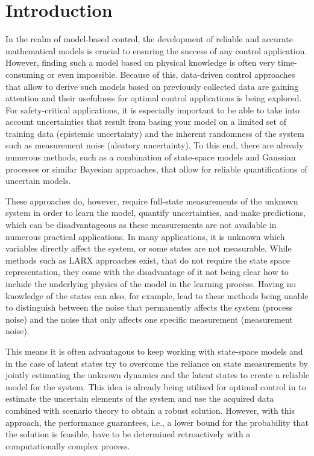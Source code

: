 \chapter{Introduction}
\label{sec:introduction}

In the realm of model-based control, the development of reliable and accurate mathematical models is crucial to ensuring the success of any control application. However, finding such a model based on physical knowledge is often very time-consuming or even impossible. Because of this, data-driven control approaches that allow to derive such models based on previously collected data are gaining attention and their usefulness for optimal control applications is being explored. For safety-critical applications, it is especially important to be able to take into account uncertainties that result from basing your model on a limited set of training data (epistemic uncertainty) and the inherent randomness of the system such as measurement noise (aleatory uncertainty). To this end, there are already numerous methods, such as a combination of state-space models and Gaussian processes \cite{Williams_06} or similar Bayesian approaches, that allow for reliable quantifications of uncertain models.

These approaches do, however, require full-state measurements of the unknown system in order to learn the model, quantify uncertainties, and make predictions, which can be disadvantageous as these measurements are not available in numerous practical applications. In many applications, it is unknown which variables directly affect the system, or some states are not measurable. While methods such as LARX approaches \cite{Maiworm_21} exist, that do not require the state space representation, they come with the disadvantage of it not being clear how to include the underlying physics of the model in the learning process. Having no knowledge of the states can also, for example, lead to these methods being unable to distinguish between the noise that permanently affects the system (process noise) and the noise that only affects one specific measurement (measurement noise). 

This means it is often advantagous to keep working with state-space models and in the case of latent states try to overcome the reliance on state measurements by jointly estimating the unknown dynamics and the latent states to create a reliable model for the system. This idea is already being utilized for optimal control in \cite{Robert_24} to estimate the uncertain elements of the system and use the acquired data combined with scenario theory \cite{Garatti_22} to obtain a robust solution. However, with this approach, the performance guarantees, i.e., a lower bound for the probability that the solution is feasible, have to be determined retroactively with a computationally complex process.
 
